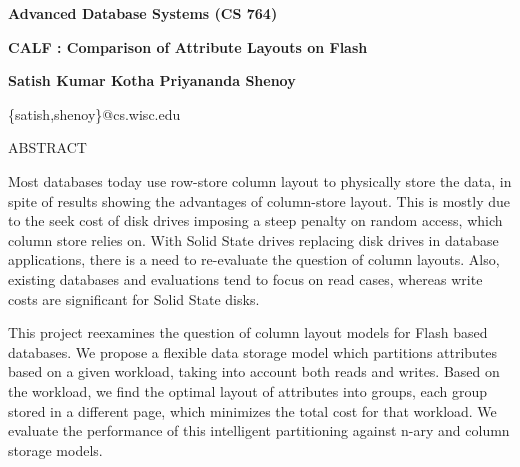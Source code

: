 \documentclass[10pt]{article}
\begin{document}
\centerline{\bf Advanced Database Systems (CS 764)}
\vspace{6pt}
\centerline{{\large {\bf CALF : Comparison of Attribute Layouts on Flash}}}
\vspace{6pt}
\centerline{{\bf Satish Kumar Kotha \hspace{20pt} Priyananda Shenoy}}
\vspace{6pt}
\centerline{ \{satish,shenoy\}@cs.wisc.edu }
\vspace{6pt}
\centerline{ ABSTRACT }

Most databases today use row-store column layout to physically store the data,
in spite of results showing the advantages of column-store layout. This is mostly
due to the seek cost of disk drives imposing a steep penalty on random access,
which column store relies on. With Solid State drives replacing disk drives
in database applications, there is a need to re-evaluate the question of
column layouts. Also, existing databases and evaluations tend to focus on read
cases, whereas write costs are significant for Solid State disks.

This project reexamines the question of column layout models for Flash based
databases. We propose a flexible data storage model which partitions attributes
based on a given workload, taking into account both reads and writes. Based on
the workload, we find the optimal layout of attributes into groups, each group
stored in a different page, which minimizes the total cost for that workload.
We evaluate the performance of this intelligent partitioning against n-ary and
column storage models.
\end{document}
